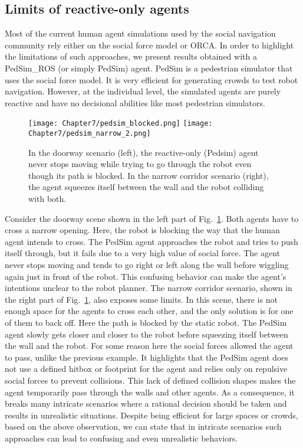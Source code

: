\subsection{Limits of reactive-only agents}
\label{sec:pedsim_compare}
Most of the current human agent simulations used by the social navigation community rely either on the social force model or ORCA. In order to highlight the limitations of such approaches, we present results obtained with a PedSim\_ROS (or simply PedSim) agent. PedSim is a pedestrian simulator that uses the social force model. It is very efficient for generating crowds to test robot navigation. However, at the individual level, the simulated agents are purely reactive and have no decisional abilities like most pedestrian simulators. 

\begin{figure}
    \centering
    \texttt{[image: Chapter7/pedsim\_blocked.png]}
    \texttt{[image: Chapter7/pedsim\_narrow\_2.png]}
    \caption{
    In the doorway scenario (left), the reactive-only (Pedsim) agent never stops moving while trying to go through the robot even though its path is blocked. 
    In the narrow corridor scenario (right), the agent squeezes itself between the wall and the robot colliding with both. 
    }
    \label{fig:limits_reactive}
    \vspace{-0.3cm}
\end{figure}

Consider the doorway scene shown in the left part of Fig.~\ref{fig:limits_reactive}. Both agents have to cross a narrow opening. Here, the robot is blocking the way that the human agent intends to cross. The PedSim agent approaches the robot and tries to push itself through, but it fails due to a very high value of social force. The agent never stops moving and tends to go right or left along the wall before wiggling again just in front of the robot. 
This confusing behavior can make the agent's intentions unclear to the robot planner. 
The narrow corridor scenario, shown in the right part of Fig.~\ref{fig:limits_reactive}, also exposes some limits. In this scene, there is not enough space for the agents to cross each other,  and the only solution is for one of them to back off. Here the path is blocked by the static robot. The PedSim agent slowly gets closer and closer to the robot before squeezing itself between the wall and the robot. For some reason here the social forces allowed the agent to pass, unlike the previous example. It highlights that the PedSim agent does not use a defined hitbox or footprint for the agent and relies only on repulsive social forces to prevent collisions. This lack of defined collision shapes makes the agent temporarily pass through the walls and other agents. As a consequence, it breaks many intricate scenarios where a rational decision should be taken and results in unrealistic situations. Despite being efficient for large spaces or crowds, based on the above observation, we can state that in intricate scenarios such approaches can lead to confusing and even unrealistic behaviors.  

